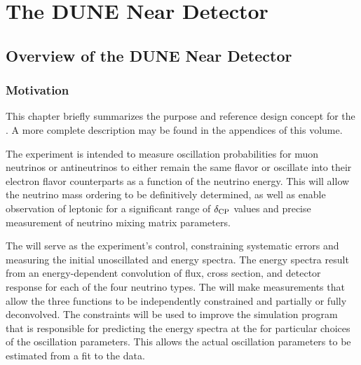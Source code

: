 \chapter{The DUNE Near Detector} %
\label{ch:exsum-nd}


\section{Overview of the DUNE Near Detector}
\label{sec:exsum-nd-overview}


\subsection{Motivation}
\label{sec:exsum-nd-BriefOverview-need}

This chapter briefly summarizes the purpose and reference design concept for the  .  A more complete description may be found in the appendices of this volume.

The  experiment is intended to measure oscillation probabilities for muon neutrinos or antineutrinos to either remain the same flavor or oscillate into their electron flavor counterparts as a function of the neutrino energy. This will allow the neutrino mass ordering to be definitively determined, as well as enable observation of leptonic  for a significant range of $\delta_{\rm{CP}}$ values and precise measurement of %
neutrino mixing matrix parameters.

The  will serve as the experiment's control,
 constraining systematic errors and measuring the initial unoscillated \numu and \nue energy spectra. %
 The energy spectra result from an energy-dependent convolution of flux, cross section, and detector response for each of the four neutrino types.
  The  will make measurements that allow the three functions to be independently constrained and partially or fully deconvolved. The constraints will be used to improve the simulation program that is responsible for predicting the energy spectra at the  for particular choices of the oscillation parameters. This allows the actual oscillation parameters to be estimated from a fit to the  data. 
 

